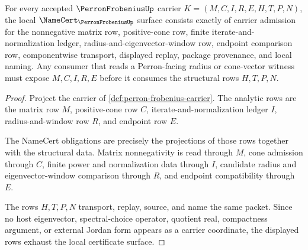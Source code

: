 \begin{theorem}
\label{thm:perron-frobenius-namecert-obligations}
For every accepted $\PerronFrobeniusUp$ carrier $K=(M,C,I,R,E,H,T,P,N)$, the local $\NameCert_{\PerronFrobeniusUp}$ surface consists exactly of carrier admission for the nonnegative matrix row, positive-cone row, finite iterate-and-normalization ledger, radius-and-eigenvector-window row, endpoint comparison row, componentwise transport, displayed replay, package provenance, and local naming. Any consumer that reads a Perron-facing radius or cone-vector witness must expose $M,C,I,R,E$ before it consumes the structural rows $H,T,P,N$.
\end{theorem}
\begin{proof}
Project the carrier of \autoref{def:perron-frobenius-carrier}. The analytic rows are the matrix row $M$, positive-cone row $C$, iterate-and-normalization ledger $I$, radius-and-window row $R$, and endpoint row $E$.

The NameCert obligations are precisely the projections of those rows together with the structural data. Matrix nonnegativity is read through $M$, cone admission through $C$, finite power and normalization data through $I$, candidate radius and eigenvector-window comparison through $R$, and endpoint compatibility through $E$.

The rows $H,T,P,N$ transport, replay, source, and name the same packet. Since no host eigenvector, spectral-choice operator, quotient real, compactness argument, or external Jordan form appears as a carrier coordinate, the displayed rows exhaust the local certificate surface.
\end{proof}

